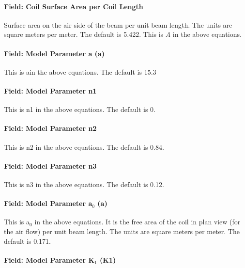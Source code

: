 \paragraph{Field: Coil Surface Area per Coil Length}\label{field-coil-surface-area-per-coil-length}

Surface area on the air side of the beam per unit beam length. The units are square meters per meter. The default is 5.422. This is \emph{A} in the above equations.

\paragraph{Field: Model Parameter a (a)}\label{field-model-parameter-a-a}

This is ain the above equations. The default is 15.3

\paragraph{Field: Model Parameter n1}\label{field-model-parameter-n1}

This is n1 in the above equations. The default is 0.

\paragraph{Field: Model Parameter n2}\label{field-model-parameter-n2}

This is n2 in the above equations. The default is 0.84.

\paragraph{Field: Model Parameter n3}\label{field-model-parameter-n3}

This is n3 in the above equations. The default is 0.12.

\paragraph{\texorpdfstring{Field: Model Parameter a\(_{0}\) (a)}{Field: Model Parameter a\_\{0\} (a)}}\label{field-model-parameter-aux5f0-a}

This is a\(_{0}\) in the above equations. It is the free area of the coil in plan view (for the air flow) per unit beam length. The units are square meters per meter. The default is 0.171.

\paragraph{\texorpdfstring{Field: Model Parameter K\(_{1}\) (K1)}{Field: Model Parameter K\_\{1\} (K1)}}\label{field-model-parameter-kux5f1-k1}


